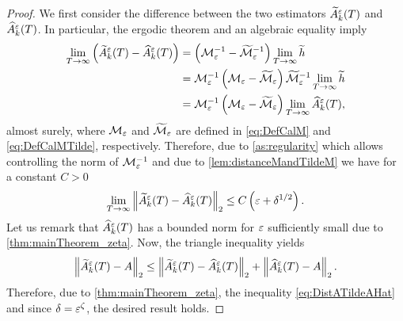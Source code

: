 \documentclass[review,onefignum,onetabnum]{siamonline190516}
\begin{document}
\begin{proof} We first consider the difference between the two estimators $\widetilde A^\varepsilon_k(T)$ and $\widehat A^\varepsilon_k(T)$. In particular, the ergodic theorem and an algebraic equality imply
	\begin{equation}
	\begin{aligned}
	\lim_{T \to \infty} \left(\widetilde A^\varepsilon_k(T) - \widehat A^\varepsilon_k(T)\right) &= \left(\mathcal M_\varepsilon^{-1} - \widetilde{\mathcal M}_\varepsilon^{-1}\right) \lim_{T \to \infty}\widetilde h \\
	&= \mathcal M_\varepsilon^{-1}\left(\mathcal M_\varepsilon - \widetilde{\mathcal M}_\varepsilon\right)  \widetilde{\mathcal M}_\varepsilon^{-1} \lim_{T \to \infty} \widetilde h\\
	&= \mathcal M_\varepsilon^{-1}\left(\mathcal M_\varepsilon - \widetilde{\mathcal M}_\varepsilon\right)\lim_{T \to \infty} \widehat A^\varepsilon_k(T),
	\end{aligned}
	\end{equation}
	almost surely, where $\mathcal M_\varepsilon$ and $\widetilde{\mathcal M}_\varepsilon$ are defined in \eqref{eq:DefCalM} and \eqref{eq:DefCalMTilde}, respectively. Therefore, due to \cref{as:regularity} which allows controlling the norm of $\mathcal M_\varepsilon^{-1}$ and due to \cref{lem:distanceMandTildeM} we have for a constant $C > 0$
	\begin{equation}\label{eq:DistATildeAHat}
	\lim_{T \to \infty} \norm{\widetilde A^\epl_k(T) - \widehat A^\epl_k(T)}_2 \leq C \left(\epl + \delta^{1/2} \right).
	\end{equation}
	Let us remark that $\widehat A^\varepsilon_k(T)$ has a bounded norm for $\varepsilon$ sufficiently small due to \cref{thm:mainTheorem_zeta}. Now, the triangle inequality yields
	\begin{equation}
	\left\|\widetilde A^\varepsilon_k(T) - A\right\|_2 \leq \left\|\widetilde A^\varepsilon_k(T) - \widehat A^\varepsilon_k(T)\right\|_2 + \left\|\widehat A^\varepsilon_k(T) - A\right\|_2.
	\end{equation}
	Therefore, due to \cref{thm:mainTheorem_zeta}, the inequality \eqref{eq:DistATildeAHat} and since $\delta = \varepsilon^\zeta$, the desired result holds.
\end{proof}
\end{document}
